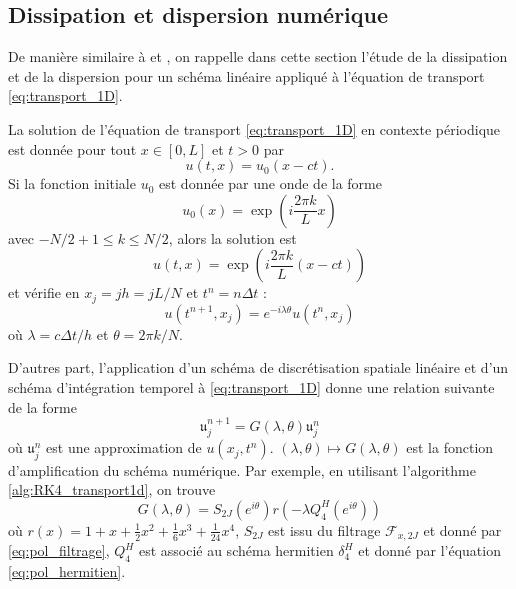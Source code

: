 \subsection{Dissipation et dispersion numérique}

De manière similaire à \cite{Desquesnes2007} et \cite{Dubois2016}, on rappelle dans cette section l'étude de la dissipation et de la dispersion pour un schéma linéaire appliqué à l'équation de transport \eqref{eq:transport_1D}.

La solution de l'équation de transport \eqref{eq:transport_1D} en contexte périodique est donnée pour tout $x \in [0,L]$ et $t>0$ par
\begin{equation}
u(t,x)=u_0(x-ct).
\end{equation}
Si la fonction initiale $u_0$ est donnée par une onde de la forme 
\begin{equation}
u_0(x) = \exp \left( i \dfrac{2 \pi k}{L} x \right)
\end{equation}
avec $-N/2 +1 \leq k \leq N/2 $, alors la solution est
\begin{equation}
u(t,x) = \exp \left( i \dfrac{2 \pi k}{L} (x-ct) \right)
\end{equation}
et vérifie en $x_j = j h = j L/N$ et $t^n = n \Delta t$ :
\begin{equation}
u(t^{n+1},x_j) = e^{-i \lambda \theta} u(t^n,x_j)
\label{eq:e(ilambdateta)}
\end{equation}
où $\lambda = c \Delta t /h$ et $\theta = 2 \pi k / N$.

D'autres part, l'application d'un schéma de discrétisation spatiale linéaire et d'un schéma d'intégration temporel à \eqref{eq:transport_1D} donne une relation suivante de la forme
\begin{equation}
\mathfrak{u}_j^{n+1} = G(\lambda, \theta) \mathfrak{u}_j^n
\end{equation}
où $\mathfrak{u}_j^n$ est une approximation de $u(x_j, t^n)$.
$(\lambda,\theta)\mapsto G(\lambda,\theta)$ est la fonction d'amplification du schéma numérique.
Par exemple, en utilisant l'algorithme \ref{alg:RK4_transport1d}, on trouve
\begin{equation}
G(\lambda, \theta) = S_{2J}(e^{i \theta}) r(- \lambda Q^H_{4}(e^{i \theta}) )
\end{equation}
où $r(x) =  1 + x + \frac{1}{2}x^2 + \frac{1}{6}x^3 + \frac{1}{24}x^4$, $S_{2J}$ est issu du filtrage $\mathcal{F}_{x,2J}$ et donné par \eqref{eq:pol_filtrage}, $Q_4^H$ est associé au schéma hermitien $\delta_4^H$ et donné par l'équation \eqref{eq:pol_hermitien}.

